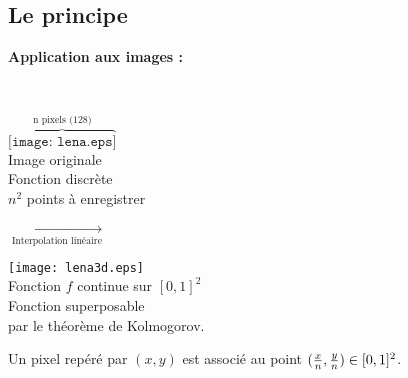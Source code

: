 \documentclass[8pt,a9paper]{beamer} \usepackage[utf8]{inputenc} \usepackage[francais]{babel} \usepackage[T1]{fontenc}
\newcommand{\titp}[1]{\begin{center}\large{\textbf{#1}}\end{center}}
\begin{document}
\subsection{Le principe}
\begin{frame}
	\titp{Application aux images :}
	\textbf{\\}
	\begin{center}
	\begin{minipage}[c]{4cm}
	\begin{center}
	$\overbrace{\texttt{[image: lena.eps]}}^{\text{n pixels (128)}}$\\
	Image originale\\Fonction discrète\\
	$n^2$ points à enregistrer
	\end{center}
	\end{minipage}
	$\xrightarrow[\text{Interpolation linéaire}]{}$
	\begin{minipage}[c]{4cm}
	\begin{center}
	\texttt{[image: lena3d.eps]}\\
	Fonction $f$ continue sur $[0,1]^2$ \\
	Fonction superposable\\ par le théorème de Kolmogorov.
	\end{center}
	\end{minipage}
	\end{center}
	Un pixel repéré par $(x,y)$ est associé au point $({x\over n},{y\over n}) \in [0,1]^2$.
\end{frame}
\end{document}
